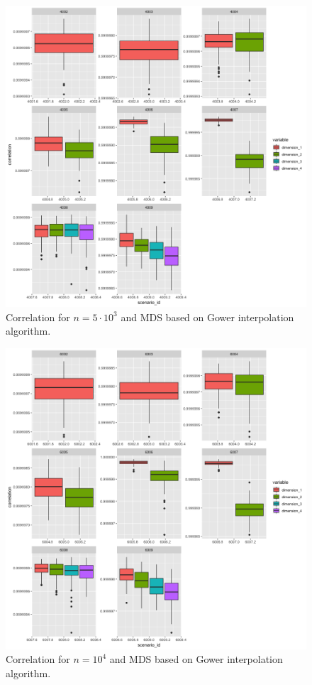 \documentclass[11pt]{report}
\begin{document}
\begin{figure}[ht]
\centering
    \includegraphics[scale = 1.5]{./images/gower_correlation_5000.png}
    \caption{Correlation for $n = 5 \cdot 10^3$ and MDS based on Gower interpolation algorithm.}
    \label{gower_correlation_5000}
\end{figure}

\begin{figure}[ht]
\centering
    \includegraphics[scale = 1.5]{./images/gower_correlation_10000.png}
    \caption{Correlation for $n = 10^4$ and MDS based on Gower interpolation algorithm.}
    \label{gower_correlation_10000}
\end{figure}
\end{document}
